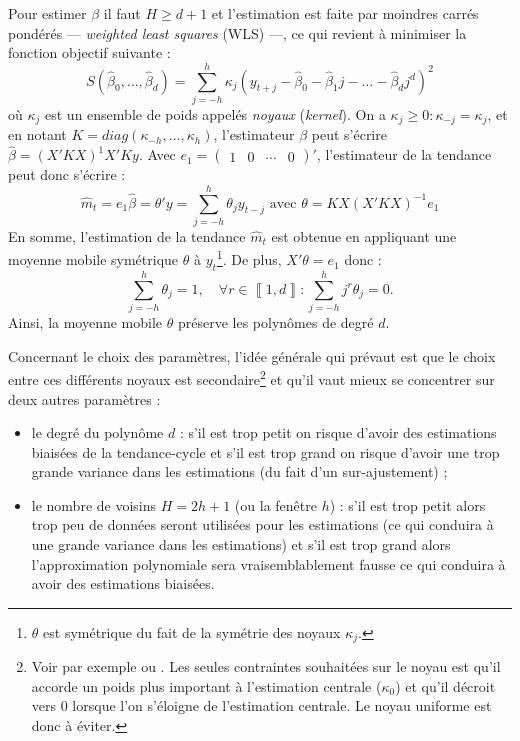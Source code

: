 \documentclass[
  12pt,
  french,
  12pt,a4paper]{article}
\newcommand\1{\mathds{1}}
\begin{document}
Pour estimer \(\beta\) il faut \(H\geq d+1\) et l'estimation est faite par moindres carrés pondérés --- \emph{weighted least squares} (WLS) ---, ce qui revient à minimiser la fonction objectif suivante :
\[
S(\hat{\beta}_{0},\dots,\hat{\beta}_{d})=\sum_{j=-h}^{h}\kappa_{j}(y_{t+j}-\hat{\beta}_{0}-\hat{\beta}_{1}j-\dots-\hat{\beta}_{d}j^{d})^{2}
\]
où \(\kappa_j\) est un ensemble de poids appelés \emph{noyaux} (\emph{kernel}).
On a \(\kappa_j\geq 0:\kappa_{-j}=\kappa_j\), et en notant \(K=diag(\kappa_{-h},\dots,\kappa_{h})\), l'estimateur \(\beta\) peut s'écrire \(\hat{\beta}=(X'KX)^{1}X'Ky\).
Avec \(e_{1}=\begin{pmatrix}1&0&\cdots&0\end{pmatrix}'\), l'estimateur de la tendance peut donc s'écrire :
\[
\hat{m}_{t}=e_{1}\hat{\beta}=\theta'y=\sum_{j=-h}^{h}\theta_{j}y_{t-j}\text{ avec }\theta=KX(X'KX)^{-1}e_{1}
\]
En somme, l'estimation de la tendance \(\hat{m}_{t}\) est obtenue en appliquant une moyenne mobile symétrique \(\theta\) à \(y_t\)\footnote{
  \(\theta\) est symétrique du fait de la symétrie des noyaux \(\kappa_j\).}.
De plus, \(X'\theta=e_{1}\) donc :
\[
\sum_{j=-h}^{h}\theta_{j}=1,\quad\forall r\in\left\llbracket 1,d\right\rrbracket :\sum_{j=-h}^{h}j^{r}\theta_{j}=0.
\]
Ainsi, la moyenne mobile \(\theta\) préserve les polynômes de degré \(d\).

Concernant le choix des paramètres, l'idée générale qui prévaut est que le choix entre ces différents noyaux est secondaire\footnote{
  Voir par exemple \textcite{cleveland1996smoothing} ou \textcite{Loader1999}.
  Les seules contraintes souhaitées sur le noyau est qu'il accorde un poids plus important à l'estimation centrale (\(\kappa_0\)) et qu'il décroit vers 0 lorsque l'on s'éloigne de l'estimation centrale.
  Le noyau uniforme est donc à éviter.} et qu'il vaut mieux se concentrer sur deux autres paramètres :

\begin{itemize}
\item
  le degré du polynôme \(d\) : s'il est trop petit on risque d'avoir des estimations biaisées de la tendance-cycle et s'il est trop grand on risque d'avoir une trop grande variance dans les estimations (du fait d'un sur-ajustement) ;
\item
  le nombre de voisins \(H=2h+1\) (ou la fenêtre \(h\)) : s'il est trop petit alors trop peu de données seront utilisées pour les estimations (ce qui conduira à une grande variance dans les estimations) et s'il est trop grand alors l'approximation polynomiale sera vraisemblablement fausse ce qui conduira à avoir des estimations biaisées.
\end{itemize}
\end{document}
